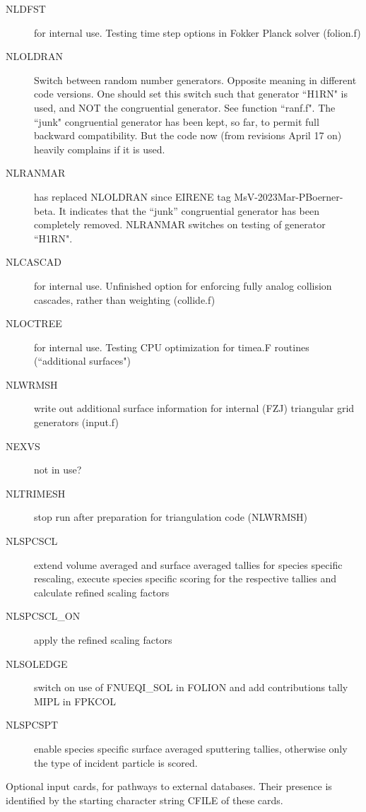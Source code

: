 \begin{description}
  \item[NLDFST] for internal use.
        Testing time step options in Fokker Planck solver (folion.f)
  \item[NLOLDRAN]
        Switch between random number generators.
        Opposite meaning in different code versions.
        One should set this switch such that generator ``H1RN" is used, and NOT the
        congruential generator.
        See function ``ranf.f".
        The ``junk" congruential generator has been kept, so far, to permit full
        backward compatibility.
        But the code now (from revisions April 17 on) heavily complains if it is used.
  \item[NLRANMAR] has replaced NLOLDRAN since EIRENE tag
        MsV-2023Mar-PBoerner-beta. It indicates that the ``junk''
        congruential generator has been completely removed.
        NLRANMAR switches on testing of generator ``H1RN".
  \item[NLCASCAD] for internal use.
        Unfinished option for enforcing fully analog collision cascades, rather than
        weighting  (collide.f)
  \item[NLOCTREE] for internal use.
        Testing CPU optimization for timea.F routines (``additional surfaces")
  \item[NLWRMSH] write out additional surface information for internal (FZJ)
        triangular grid generators (input.f)
  \item[NEXVS] not in use?
  \item[NLTRIMESH] stop run after preparation for triangulation code (NLWRMSH)
  \item[NLSPCSCL] extend volume averaged and surface averaged tallies for species
        specific rescaling, execute species specific scoring for the respective tallies
        and calculate refined scaling factors
  \item[NLSPCSCL\_ON] apply the refined scaling factors
  \item[NLSOLEDGE] switch on use of FNUEQI\_SOL in FOLION and add contributions tally MIPL in FPKCOL
  \item[NLSPCSPT] enable species specific surface averaged sputtering tallies,
	otherwise only the type of incident particle is scored.
\end{description}
Optional input cards,
for pathways to external databases.
Their presence is identified by the starting character string CFILE of these
cards.
